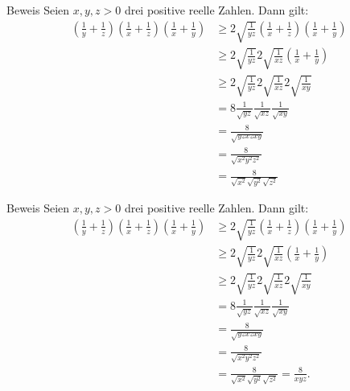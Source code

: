 \documentclass[10pt]{beamer}
\begin{document}
\begin{frame}{Beweis}
    Seien \(x, y, z > 0\) drei positive reelle Zahlen. Dann gilt:
    \begin{align*}
        \left( \frac{1}{y} + \frac{1}{z} \right) \left( \frac{1}{x} + \frac{1}{z} \right) \left( \frac{1}{x} + \frac{1}{y} \right)
        & \geq 2\sqrt{\frac{1}{yz}} \left( \frac{1}{x} + \frac{1}{z} \right) \left( \frac{1}{x} + \frac{1}{y} \right) \\
        & \geq 2\sqrt{\frac{1}{yz}} 2\sqrt{\frac{1}{xz}} \left( \frac{1}{x} + \frac{1}{y} \right) \\
        & \geq 2\sqrt{\frac{1}{yz}} 2\sqrt{\frac{1}{xz}} 2\sqrt{\frac{1}{xy}} \\
        & = 8 \frac{1}{\sqrt{yz}} \frac{1}{\sqrt{xz}} \frac{1}{\sqrt{xy}} \\
        & = \frac{8}{\sqrt{yz xz xy}} \\
        & = \frac{8}{\sqrt{x^{2} y^{2} z^{2}}} \\
        & = \frac{8}{\sqrt{x^{2}} \sqrt{y^{2}} \sqrt{z^{2}}}
    \end{align*}
\end{frame}



\begin{frame}{Beweis}
    Seien \(x, y, z > 0\) drei positive reelle Zahlen. Dann gilt:
    \begin{align*}
        \left( \frac{1}{y} + \frac{1}{z} \right) \left( \frac{1}{x} + \frac{1}{z} \right) \left( \frac{1}{x} + \frac{1}{y} \right)
        & \geq 2\sqrt{\frac{1}{yz}} \left( \frac{1}{x} + \frac{1}{z} \right) \left( \frac{1}{x} + \frac{1}{y} \right) \\
        & \geq 2\sqrt{\frac{1}{yz}} 2\sqrt{\frac{1}{xz}} \left( \frac{1}{x} + \frac{1}{y} \right) \\
        & \geq 2\sqrt{\frac{1}{yz}} 2\sqrt{\frac{1}{xz}} 2\sqrt{\frac{1}{xy}} \\
        & = 8 \frac{1}{\sqrt{yz}} \frac{1}{\sqrt{xz}} \frac{1}{\sqrt{xy}} \\
        & = \frac{8}{\sqrt{yz xz xy}} \\
        & = \frac{8}{\sqrt{x^{2} y^{2} z^{2}}} \\
        & = \frac{8}{\sqrt{x^{2}} \sqrt{y^{2}} \sqrt{z^{2}}}
        = \frac{8}{xyz}.
    \end{align*}
\end{frame}
\end{document}
